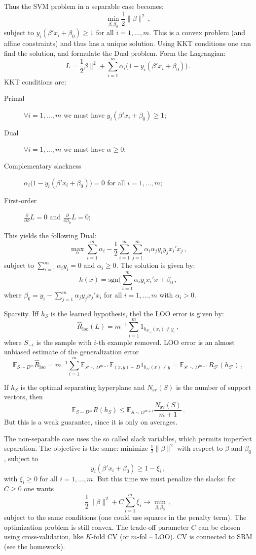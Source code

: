 \documentclass[a4paper]{article}
\newcommand{\ex}{\mathbb{E}}
\begin{document}
Thus the SVM problem in a separable case becomes:
\[ \min_{\beta, \beta_0} \frac{1}{2} \|\beta\|^2 \,,\]
subject to $y_i(\beta'x_i + \beta_0) \geq 1$ for all $i=1, \ldots, m$. This is a
convex problem (and affine constraints) and thus has a unique solution. Using KKT
conditions one can find the solution, and formulate the Dual problem. Form the
Lagrangian:
\[ L = \frac{1}{2}\beta\|^2 + \sum_{i=1}^m \alpha_i\bigl(1-y_i(\beta'x_i + \beta_0)\bigr) \,.\]
KKT conditions are: \begin{description}
    \item[Primal] $\forall i=1,\ldots, m$ we must have $y_i(\beta'x_i + \beta_0) \geq 1$;
    \item[Dual] $\forall i=1,\ldots, m$ we must have $\alpha \geq 0$;
    \item[Complementary slackness] $\alpha_i\bigl(1-y_i(\beta'x_i + \beta_0)\bigr) = 0$ for all $i=1,\ldots, m$;
    \item[First-order] $\frac{\partial}{\partial \beta} L = 0$ and $\frac{\partial}{\partial \beta_0} L = 0$;
\end{description}
This yields the following Dual:
\[\max_\alpha \sum_{i=1}^m \alpha_i - \frac{1}{2}\sum_{i=1}^m \sum_{j=1}^m \alpha_i \alpha_j y_i y_j x_i'x_j \,, \]
subject to $\sum_{i=1}^m \alpha_i y_i = 0$ and $\alpha_i \geq 0$. The solution is
given by:
\[ h(x) = \text{sgn}(\sum_{i=1}^m \alpha_i y_i x_i'x + \beta_0 \,,\]
where $\beta_0 = y_i - \sum_{j=1}^m \alpha_j y_j x_j'x_i$ for all $i=1,\ldots, m$
with $\alpha_i > 0$.

Sparsity. Iff $h_S$ is the learned hypothesis, thel the LOO error is given by:
\[ \hat{R}_{\text{loo}}(L) = m^{-1} \sum_{i=1}^m 1_{h_{S_{-i}}(x_i) \neq y_i} \,, \]
where $S_{-i}$ is the sample with $i$-th example removed. LOO error is an almost
unbiased estimate of the generalization error 
\[ \ex_{S\sim D^m} \hat{R}_{\text{loo}}
    = m^{-1}\sum_{i=1}^m \ex_{S'\sim D^{m-1}} \ex_{(x, y)\sim D} 1_{h_{S'}(x) \neq y}
    = \ex_{S'\sim D^{m-1}} R_{S'}(h_{S'})
    \,, \]

If $h_S$ is the optimal separating hyperplane and $N_{\text{sv}}(S)$ is the number
of support vectors, then
\[\ex_{S\sim D^m} R(h_S) \leq \ex_{S\sim D^{m+1}} \frac{N_{\text{sv}}(S)}{m+1} \,. \]
But this is a weak guarantee, since it is only on averages.

The non-separable case uses the so called slack variables, which permits imperfect
separation. The objective is the same: minimize $\frac{1}{2}\|\beta\|^2$ with respect
to $\beta$ and $\beta_0$, subject to
\[ y_i(\beta'x_i + \beta_0) \geq 1 - \xi_i \,,\]
with $\xi_i \geq 0$ for all $i=1,\ldots, m$. But this time we must penalize the slacks:
for $C \geq 0$ one wants
\[ \frac{1}{2}\|\beta\|^2 + C \sum_{i=1}^m \xi_i \to \min_{\beta, \beta_0} \,, \]
subject to the same conditions (one could use squares in the penalty term). 
The optimization problem is still convex. The trade-off parameter $C$ can be chosen
using cross-validation, like $K$-fold CV (or $m$-fol -- LOO). CV is connected to
SRM (see the homework).
\end{document}
